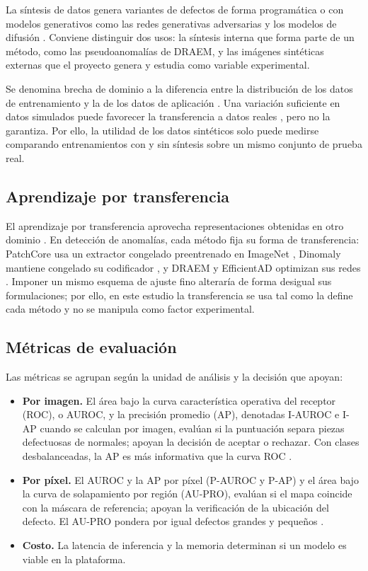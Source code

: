\documentclass[12pt,oneside]{report}
\begin{document}
La síntesis de datos genera variantes de defectos de forma programática \cite{shorten2019,perlin1985} o con modelos generativos como las redes generativas adversarias y los modelos de difusión \cite{goodfellow2014,ho2020}. Conviene distinguir dos usos: la síntesis interna que forma parte de un método, como las pseudoanomalías de DRAEM, y las imágenes sintéticas externas que el proyecto genera y estudia como variable experimental.

Se denomina brecha de dominio a la diferencia entre la distribución de los datos de entrenamiento y la de los datos de aplicación \cite{pan2010}. Una variación suficiente en datos simulados puede favorecer la transferencia a datos reales \cite{tobin2017}, pero no la garantiza. Por ello, la utilidad de los datos sintéticos solo puede medirse comparando entrenamientos con y sin síntesis sobre un mismo conjunto de prueba real.

\subsection{Aprendizaje por transferencia}

El aprendizaje por transferencia aprovecha representaciones obtenidas en otro dominio \cite{pan2010,yosinski2014}. En detección de anomalías, cada método fija su forma de transferencia: PatchCore usa un extractor congelado preentrenado en ImageNet \cite{roth2022}, Dinomaly mantiene congelado su codificador \cite{guo2025}, y DRAEM y EfficientAD optimizan sus redes \cite{zavrtanik2021,batzner2024}. Imponer un mismo esquema de ajuste fino alteraría de forma desigual sus formulaciones; por ello, en este estudio la transferencia se usa tal como la define cada método y no se manipula como factor experimental.

\subsection{Métricas de evaluación}

Las métricas se agrupan según la unidad de análisis y la decisión que apoyan:

\begin{itemize}
  \item \textbf{Por imagen.} El área bajo la curva característica operativa del receptor (ROC), o AUROC, y la precisión promedio (AP), denotadas I-AUROC e I-AP cuando se calculan por imagen, evalúan si la puntuación separa piezas defectuosas de normales; apoyan la decisión de aceptar o rechazar. Con clases desbalanceadas, la AP es más informativa que la curva ROC \cite{saito2015}.
  \item \textbf{Por píxel.} El AUROC y la AP por píxel (P-AUROC y P-AP) y el área bajo la curva de solapamiento por región (AU-PRO), evalúan si el mapa coincide con la máscara de referencia; apoyan la verificación de la ubicación del defecto. El AU-PRO pondera por igual defectos grandes y pequeños \cite{bergmann2021,heckler2026}.
  \item \textbf{Costo.} La latencia de inferencia y la memoria determinan si un modelo es viable en la plataforma.
\end{itemize}
\end{document}
